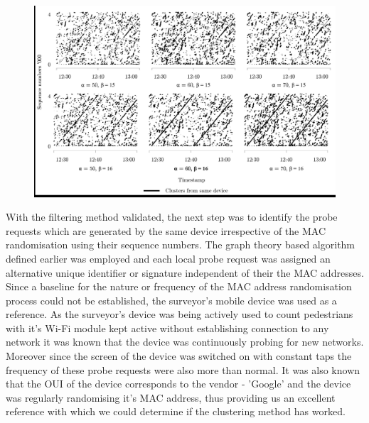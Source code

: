 \begin{figure}
  \includegraphics[trim={1 1 1 1},clip]{images/processing-oxst-clusters.jpg}
  \caption{}
  \label{figure:processing:oxst:clusters}
\end{figure}

With the filtering method validated, the next step was to identify the probe requests which are generated by the same device irrespective of the MAC randomisation using their sequence numbers.
The graph theory based algorithm defined earlier was employed and each local probe request was assigned an alternative unique identifier or signature independent of their the MAC addresses.
Since a baseline for the nature or frequency of the MAC address randomisation process could not be established, the surveyor's mobile device was used as a reference.
As the surveyor's device was being actively used to count pedestrians with it's Wi-Fi module kept active without establishing connection to any network it was known that the device was continuously probing for new networks.
Moreover since the screen of the device was switched on with constant taps the frequency of these probe requests were also more than normal.
It was also known that the OUI of the device corresponds to the vendor - 'Google' and the device was regularly randomising it's MAC address, thus providing us an excellent reference with which we could determine if the clustering method has worked.

